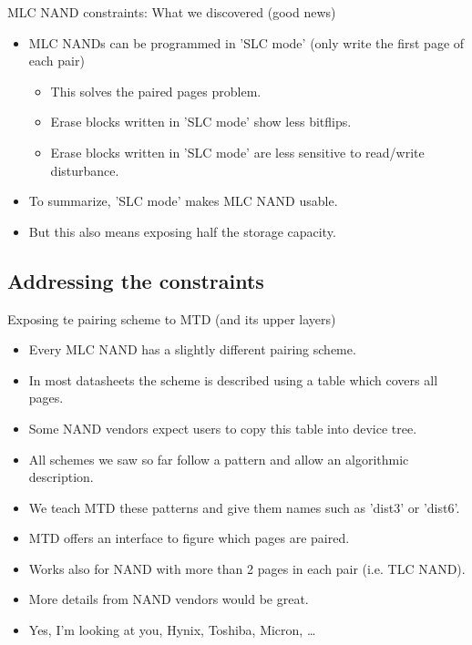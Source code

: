 \documentclass[aspectratio=169,obeyspaces,spaces,hyphens,dvipsnames]{beamer}
\begin{document}
\begin{frame}{MLC NAND constraints: What we discovered (good news)}
  \begin{itemize}
  \item MLC NANDs can be programmed in 'SLC mode' (only write the first
	page of each pair)
    \begin{itemize}
    \item This solves the paired pages problem.
    \item Erase blocks written in 'SLC mode' show less bitflips.
    \item Erase blocks written in 'SLC mode' are less sensitive to
	  read/write disturbance.
    \end{itemize}
  \item To summarize, 'SLC mode' makes MLC NAND usable.
  \item But this also means exposing half the storage capacity.
  \end{itemize}
\end{frame}

\subsection{Addressing the constraints}

\begin{frame}{Exposing te pairing scheme to MTD (and its upper layers)}
  \begin{itemize}
  \item Every MLC NAND has a slightly different pairing scheme.
  \item In most datasheets the scheme is described using a table which covers all pages.
  \item Some NAND vendors expect users to copy this table into device tree.
  \item All schemes we saw so far follow a pattern and allow an algorithmic description.
  \item We teach MTD these patterns and give them names such as 'dist3' or 'dist6'.
  \item MTD offers an interface to figure which pages are paired.
  \item Works also for NAND with more than 2 pages in each pair (i.e. TLC NAND).
  \item More details from NAND vendors would be great.
  \item Yes, I'm looking at you, Hynix, Toshiba, Micron, \ldots
  \end{itemize}
\end{frame}
\end{document}

